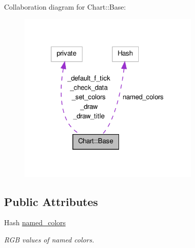 Collaboration diagram for Chart::Base:\nopagebreak
\begin{figure}[H]
\begin{center}
\leavevmode
\includegraphics[width=247pt]{classChart_1_1Base__coll__graph}
\end{center}
\end{figure}
\subsection*{Public Attributes}
\begin{DoxyCompactItemize}
\item 
Hash \hyperlink{classChart_1_1Base_a38c2792df08724efa7c4e1b9194cbe6e}{named\_\-colors}
\begin{DoxyCompactList}\small\item\em RGB values of named colors. \item\end{DoxyCompactList}\end{DoxyCompactItemize}
